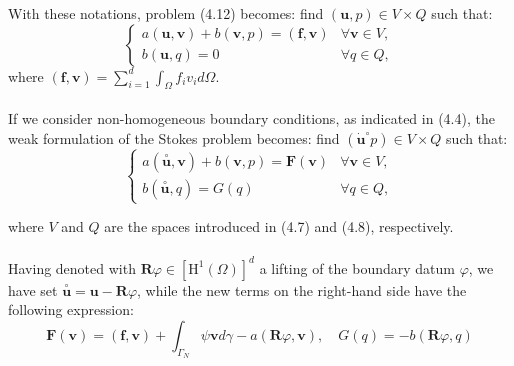 \documentclass[11pt]{book}
\begin{document}
With these notations, problem (4.12) becomes: find $(\mathbf{u}, p) \in V \times Q$ such that:
\begin{equation}
\begin{cases}a(\mathbf{u}, \mathbf{v})+b(\mathbf{v}, p)=(\mathbf{f}, \mathbf{v}) & \forall \mathbf{v} \in V, \\ b(\mathbf{u}, q)=0 & \forall q \in Q,\end{cases}
\end{equation}
where $(\mathbf{f}, \mathbf{v})=\sum_{i=1}^{d} \int_{\Omega} f_{i} v_{i} d \Omega$.\\ \\
If we consider non-homogeneous boundary conditions, as indicated in (4.4), the weak formulation of the Stokes problem becomes: find $\left(\dot{\mathbf{u}}^{\circ} p\right) \in V \times Q$ such that:
\begin{equation}
\begin{cases}a(\stackrel{\circ}{\mathbf{u}}, \mathbf{v})+b(\mathbf{v}, p)=\mathbf{F}(\mathbf{v}) & \forall \mathbf{v} \in V, \\ b(\stackrel{\circ}{\mathbf{u}}, q)=G(q) & \forall q \in Q,\end{cases}
\end{equation}

where $V$ and $Q$ are the spaces introduced in (4.7) and (4.8), respectively.\\ \\
Having denoted with $\mathbf{R} \varphi \in\left[\mathrm{H}^{1}(\Omega)\right]^{d}$ a lifting of the boundary datum $\varphi$, we have set $\stackrel{\circ}{\mathbf{u}}=\mathbf{u}-\mathbf{R} \varphi$, while the new terms on the right-hand side have the following expression:
\begin{equation}
\mathbf{F}(\mathbf{v})=(\mathbf{f}, \mathbf{v})+\int_{\Gamma_{N}} \psi \mathbf{v} d \gamma-a(\mathbf{R} \varphi, \mathbf{v}), \quad G(q)=-b(\mathbf{R} \varphi, q)
\end{equation}
\end{document}
